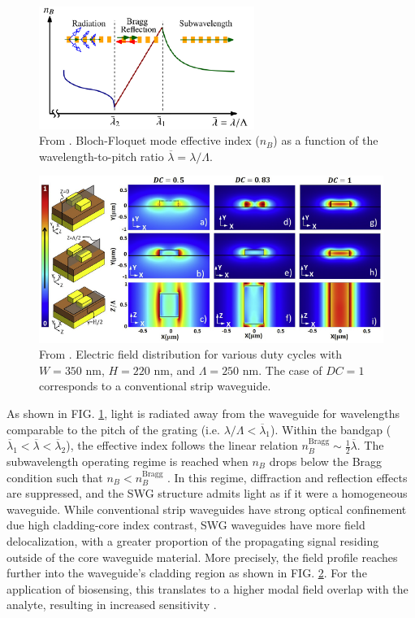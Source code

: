 \documentclass[aps,prl,twocolumn, superscriptaddress,nobalancelastpage]{revtex4}
\begin{document}
 \begin{figure}[!h]
    \centering
    \includegraphics[width=7cm]{swgoperation.png}
    \caption{From \cite{HalirReview}. Bloch-Floquet mode effective index ($n_B$) as a function of the wavelength-to-pitch ratio $\overline{\lambda} = \lambda/\Lambda$.}
    \label{fig:SWGoperation}
\end{figure}

\pagebreak

\onecolumngrid

 \begin{figure}[!ht]
    \centering
    \includegraphics[width=15cm]{swgfield.png}
    \caption{From \cite{swg1}. Electric field distribution for various duty cycles with $W=350$ nm, $H=220$ nm, and $\Lambda = 250$ nm. The case of $DC=1$ corresponds to a conventional strip waveguide.}
    \label{fig:swgfield}
\end{figure}

\twocolumngrid

As shown in FIG. \ref{fig:SWGoperation}, light is radiated away from the waveguide for wavelengths comparable to the pitch of the grating (i.e. $\lambda/\Lambda <\overline{\lambda}_1$). Within the bandgap ($\overline{\lambda}_1<\overline{\lambda}<\overline{\lambda}_2$), the effective index follows the linear relation $n_B^{\text{Bragg}} \sim \frac{1}{2}\overline{\lambda}$. The subwavelength operating regime is reached when $n_B$ drops below the Bragg condition such that $n_B<n_B^{\text{Bragg}}$ \cite{HalirReview}. In this regime, diffraction and reflection effects are suppressed, and the SWG structure admits light as if it were a homogeneous waveguide. While conventional strip waveguides have strong optical confinement due high cladding-core index contrast, SWG waveguides have more field delocalization, with a greater proportion of the propagating signal residing outside of the core waveguide material. More precisely, the field profile reaches further into the waveguide's cladding region as shown in FIG. \ref{fig:swgfield}. For the application of biosensing, this translates to a higher modal field overlap with the analyte, resulting in increased sensitivity \cite{EvFieldBio}.
\end{document}
